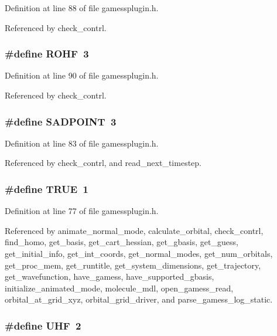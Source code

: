 Definition at line 88 of file gamessplugin.h.

Referenced by check\_\-contrl.
\subsubsection{\setlength{\rightskip}{0pt plus 5cm}\#define ROHF\ 3}\label{gamessplugin_8h_a14}




Definition at line 90 of file gamessplugin.h.

Referenced by check\_\-contrl.
\subsubsection{\setlength{\rightskip}{0pt plus 5cm}\#define SADPOINT\ 3}\label{gamessplugin_8h_a10}




Definition at line 83 of file gamessplugin.h.

Referenced by check\_\-contrl, and read\_\-next\_\-timestep.
\subsubsection{\setlength{\rightskip}{0pt plus 5cm}\#define TRUE\ 1}\label{gamessplugin_8h_a7}




Definition at line 77 of file gamessplugin.h.

Referenced by animate\_\-normal\_\-mode, calculate\_\-orbital, check\_\-contrl, find\_\-homo, get\_\-basis, get\_\-cart\_\-hessian, get\_\-gbasis, get\_\-guess, get\_\-initial\_\-info, get\_\-int\_\-coords, get\_\-normal\_\-modes, get\_\-num\_\-orbitals, get\_\-proc\_\-mem, get\_\-runtitle, get\_\-system\_\-dimensions, get\_\-trajectory, get\_\-wavefunction, have\_\-gamess, have\_\-supported\_\-gbasis, initialize\_\-animated\_\-mode, molecule\_\-mdl, open\_\-gamess\_\-read, orbital\_\-at\_\-grid\_\-xyz, orbital\_\-grid\_\-driver, and parse\_\-gamess\_\-log\_\-static.
\subsubsection{\setlength{\rightskip}{0pt plus 5cm}\#define UHF\ 2}\label{gamessplugin_8h_a13}




